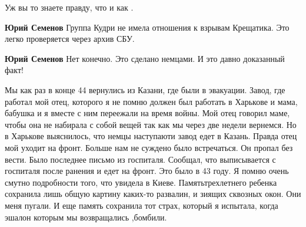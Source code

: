 \begin{itemize}
\begin{itemize}
\begin{itemize}
Уж вы то знаете правду, что и как .
\end{itemize}

 
\textbf{Юрий Семенов} Группа Кудри не имела отношения к взрывам Крещатика. Это легко проверяется через архив СБУ.


 
\textbf{Юрий Семенов} Нет конечно. Это сделано немцами. И это давно доказанный факт!

\end{itemize}

 

Мы как раз в конце 44 вернулись из Казани, где были в эвакуации. Завод, где
работал мой отец, которого я не помню должен был работать в Харькове и
мама, бабушка и я вместе с ним переежали на время войны. Мой отец говорил
маме, чтобы она не набирала с собой вещей так как мы через две недели
вернемся. Но в Харькове выяснилось, что немцы наступаюти завод едет в
Казань. Правда отец мой уходит на фронт. Больше нам не суждено было
встречаться. Он пропал без вести. Было последнее письмо из госпиталя. Сообщал, что
выписывается с госпиталя после ранения и едет на фронт. Это было в 43 году. Я
помню очень смутно подробности того, что увидела в Киеве. Памятьтрехлетнего
ребенка сохранила лишь общую картину каких-то развалин, и зиящих сквозных
окон. Они меня пугали. И еще память сохранила тот страх, который я испытала, когда
эшалон которым мы возвращались ,бомбили.

 


\end{itemize}
